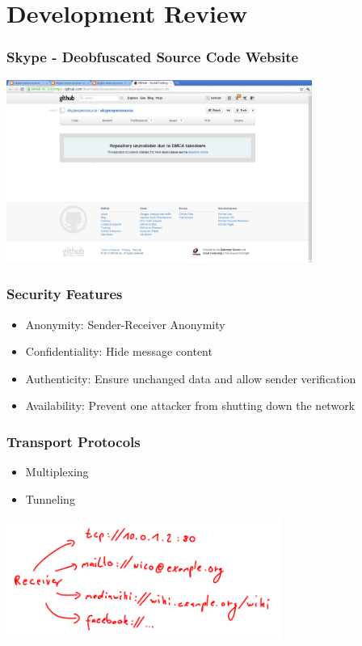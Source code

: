 \documentclass{beamer}
\begin{document}
\section{Development Review}
\frame
{
    \frametitle{Skype - Deobfuscated Source Code Website}

    \begin{center}
        \includegraphics[width=10cm]{dmca-skype.png}
    \end{center}
}

\frame
{
  \frametitle{Security Features}
  \begin{itemize}
          \item Anonymity: Sender-Receiver Anonymity
          \item Confidentiality: Hide message content
          \item Authenticity: Ensure unchanged data and allow sender verification
          \item Availability: Prevent one attacker from shutting down the network
   \end{itemize}
}

\frame
{
  \frametitle{Transport Protocols}
  \begin{itemize}
      \item Multiplexing
      \item Tunneling
  \end{itemize}
  \begin{center}
   \includegraphics[width=9cm]{../addressmultiplexing.png}
  \end{center}
}
\end{document}
